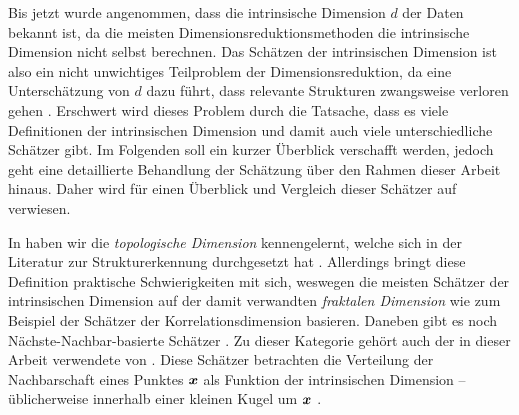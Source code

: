 Bis jetzt wurde angenommen, dass die intrinsische Dimension $d$ der Daten bekannt ist, da die
meisten Dimensionsreduktionsmethoden die intrinsische Dimension nicht selbst berechnen. Das
Schätzen der intrinsischen Dimension ist also ein nicht unwichtiges Teilproblem der
Dimensionsreduktion, da eine Unterschätzung von $d$ dazu führt, dass relevante Strukturen
zwangsweise verloren gehen \parencite[1]{Levina.2004}. Erschwert wird dieses Problem durch die Tatsache, dass es viele
Definitionen der intrinsischen Dimension und damit auch viele unterschiedliche Schätzer gibt. Im
Folgenden soll ein kurzer Überblick verschafft werden, jedoch geht eine detaillierte Behandlung der
Schätzung über den Rahmen dieser Arbeit hinaus. Daher wird für einen Überblick und Vergleich dieser
Schätzer auf \textcites{Campadelli.2015}{Bac.2021}{Verveer.1995} verwiesen.

In  haben wir die \textit{topologische
	Dimension} kennengelernt, welche sich in der Literatur zur Strukturerkennung durchgesetzt hat \parencite[1]{Campadelli.2015}. Allerdings bringt diese Definition praktische Schwierigkeiten mit sich,
weswegen die meisten Schätzer der intrinsischen Dimension auf der damit verwandten
\textit{fraktalen Dimension} wie zum Beispiel der Schätzer der Korrelationsdimension \parencite{Camastra.2002} basieren. Daneben gibt es noch Nächste-Nachbar-basierte Schätzer \parencite[1]{Campadelli.2015}. Zu dieser Kategorie gehört auch der in dieser Arbeit verwendete
 von \textcite{Levina.2004}. Diese Schätzer betrachten die
Verteilung der Nachbarschaft eines Punktes $\bm{x}$ als Funktion der intrinsischen Dimension --
üblicherweise innerhalb einer kleinen Kugel um $\bm{x}$
\parencite[8]{Campadelli.2015}.

